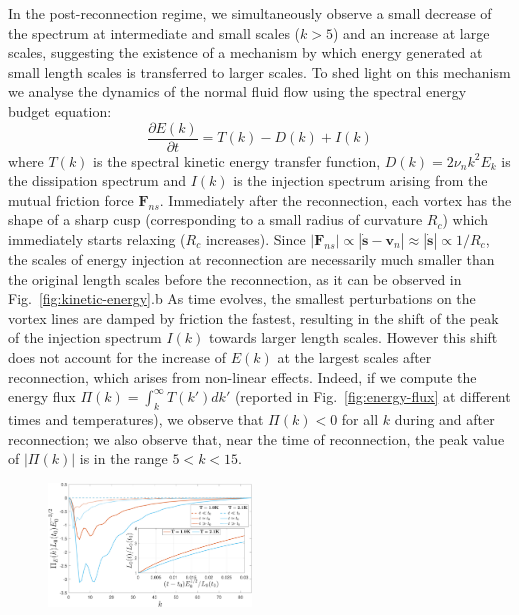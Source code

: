 \documentclass[%
 reprint,
 amsmath,amssymb,
 aps,
 prl,
]{revtex4-2}
\def \s{\mathbf{s}}
\def \v{\mathbf{v}}
\def \k{\mathbf{k}}
\begin{document}
{In the post-reconnection regime, we simultaneously observe a small 
decrease of the spectrum at intermediate 
and small scales ($k > 5$) and an increase at large scales, 
suggesting the existence of a mechanism by 
which energy generated at small length scales is transferred to larger scales. 
To shed light on this mechanism
we analyse the dynamics of the normal fluid flow using the 
spectral energy budget equation: 
%
\begin{equation}
    \frac{\partial E(k)}{\partial t} = T(k) - D(k) + I(k)
\end{equation}
where $T(k)$ is the spectral kinetic energy transfer function,
$D(k)=2\nu_n k^2 E_k$ is the dissipation spectrum and
$I(k)$ is the injection spectrum arising from the mutual friction 
force $\mathbf{F}_{ns}$. 
Immediately after the reconnection, each vortex has the shape of
a sharp cusp (corresponding to a small radius of curvature $R_c$)
which immediately starts relaxing ($R_c$ increases). Since
$|\mathbf{F}_{ns}| \propto  |\dot{\s}-\v_n| \approx |\dot{\s}| \propto 1/R_c$, 
the scales of energy injection at reconnection are necessarily
much smaller than the original length scales before the reconnection, 
as it can be observed in Fig.~\ref{fig:kinetic-energy}.b 
As time evolves, the smallest perturbations on the vortex lines are damped 
by friction the fastest, resulting in the shift of 
the peak of the injection spectrum $I(k)$ towards larger length scales. 
However this shift does not account 
for the increase of $E(k)$ at the largest scales after reconnection, 
which arises from non-linear effects.
Indeed, if we compute the energy flux 
$\displaystyle \Pi(k) = \int_{k}^{\infty}T(k') dk'$ 
(reported in Fig.~\ref{fig:energy-flux} at different times and temperatures), 
we observe that $\Pi(k) < 0$ for all $k$ during and after reconnection;
we also observe that, near the time of reconnection,
the peak value of $|\Pi(k)|$ is in the range $5 < k < 15$.
%
\begin{figure}[t]
    \centering
    \includegraphics*[width=0.48\textwidth]{flux-spec.pdf}

\end{figure}}
\end{document}
